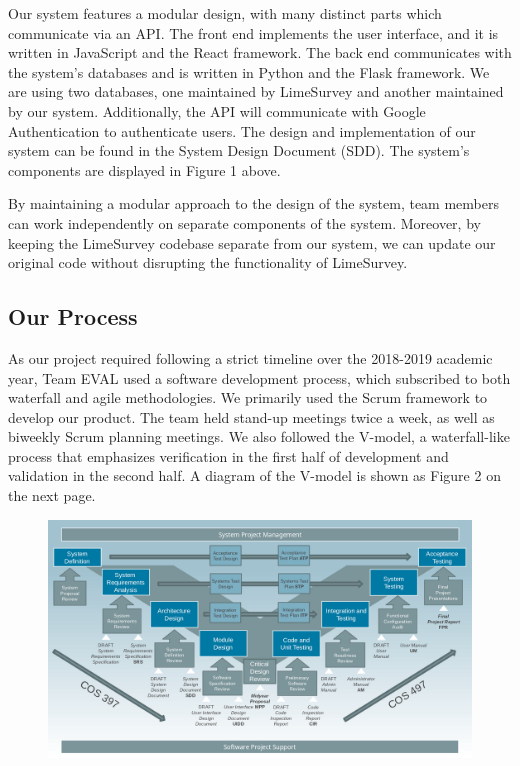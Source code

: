 \documentclass{article}
\begin{document}
Our system features a modular design, with many distinct parts which communicate via an API. The front end implements the user interface, and it is written in JavaScript and the React framework. The back end communicates with the system's databases and is written in Python and the Flask framework. We are using two databases, one maintained by LimeSurvey and another maintained by our system. Additionally, the API will communicate with Google Authentication to authenticate users. The design and implementation of our system can be found in the System Design Document (SDD). The system's components are displayed in Figure 1 above.

By maintaining a modular approach to the design of the system, team members can work independently on separate components of the system. Moreover, by keeping the LimeSurvey codebase separate from our system, we can update our original code without disrupting the functionality of LimeSurvey.

\subsection{Our Process}

As our project required following a strict timeline over the 2018-2019 academic year, Team EVAL used a software development process, which subscribed to both waterfall and agile methodologies. We primarily used the Scrum framework to develop our product. The team held stand-up meetings twice a week, as well as biweekly Scrum planning meetings. We also followed the V-model, a waterfall-like process that emphasizes verification in the first half of development and validation in the second half. A diagram of the V-model is shown as Figure 2 on the next page.

\begin{center}
\begin{figure}[H]
\centering
\vspace{2mm}
{\includegraphics[scale=.6]{images/V-model-Yoo.png}}
\end{figure}
\end{center}
\end{document}
